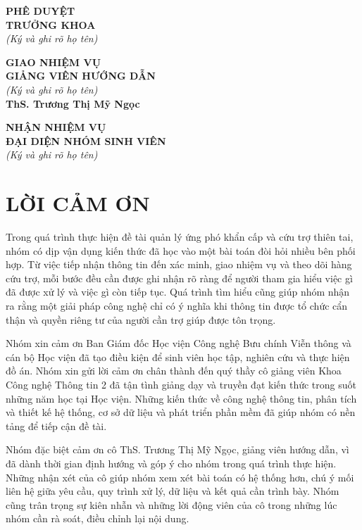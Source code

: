 \documentclass[12pt,a4paper,oneside]{report}
\newcommand{\advisorname}{ThS. Trương Thị Mỹ Ngọc}
\newcommand{\frontchapter}[1]{%
  \chapter*{#1}%
  \phantomsection%
  \addcontentsline{toc}{chapter}{#1}%
  \markboth{#1}{}%
}
\begin{document}
{
\noindent\begin{minipage}[t]{0.29\textwidth}\centering
  \textbf{PHÊ DUYỆT}\\
  \textbf{TRƯỞNG KHOA}\\
  \textit{(Ký và ghi rõ họ tên)}\\
\end{minipage}\hfill
\begin{minipage}[t]{0.33\textwidth}\centering
  \textbf{GIAO NHIỆM VỤ}\\
  \textbf{GIẢNG VIÊN HƯỚNG DẪN}\\
  \textit{(Ký và ghi rõ họ tên)}\\[2.6cm]
  \textbf{\advisorname}
\end{minipage}\hfill
\begin{minipage}[t]{0.36\textwidth}\centering
  \textbf{NHẬN NHIỆM VỤ}\\
  \textbf{ĐẠI DIỆN NHÓM SINH VIÊN}\\
  \textit{(Ký và ghi rõ họ tên)}\\
\end{minipage}\par}

\clearpage
{}
\frontchapter{LỜI CẢM ƠN}
Trong quá trình thực hiện đề tài quản lý ứng phó khẩn cấp và cứu trợ thiên tai, nhóm có dịp vận dụng kiến thức đã học vào một bài toán đòi hỏi nhiều bên phối hợp. Từ việc tiếp nhận thông tin đến xác minh, giao nhiệm vụ và theo dõi hàng cứu trợ, mỗi bước đều cần được ghi nhận rõ ràng để người tham gia hiểu việc gì đã được xử lý và việc gì còn tiếp tục. Quá trình tìm hiểu cũng giúp nhóm nhận ra rằng một giải pháp công nghệ chỉ có ý nghĩa khi thông tin được tổ chức cẩn thận và quyền riêng tư của người cần trợ giúp được tôn trọng.

Nhóm xin cảm ơn Ban Giám đốc Học viện Công nghệ Bưu chính Viễn thông và cán bộ Học viện đã tạo điều kiện để sinh viên học tập, nghiên cứu và thực hiện đồ án. Nhóm xin gửi lời cảm ơn chân thành đến quý thầy cô giảng viên Khoa Công nghệ Thông tin 2 đã tận tình giảng dạy và truyền đạt kiến thức trong suốt những năm học tại Học viện. Những kiến thức về công nghệ thông tin, phân tích và thiết kế hệ thống, cơ sở dữ liệu và phát triển phần mềm đã giúp nhóm có nền tảng để tiếp cận đề tài.

Nhóm đặc biệt cảm ơn cô ThS. Trương Thị Mỹ Ngọc, giảng viên hướng dẫn, vì đã dành thời gian định hướng và góp ý cho nhóm trong quá trình thực hiện. Những nhận xét của cô giúp nhóm xem xét bài toán có hệ thống hơn, chú ý mối liên hệ giữa yêu cầu, quy trình xử lý, dữ liệu và kết quả cần trình bày. Nhóm cũng trân trọng sự kiên nhẫn và những lời động viên của cô trong những lúc nhóm cần rà soát, điều chỉnh lại nội dung.
\end{document}
